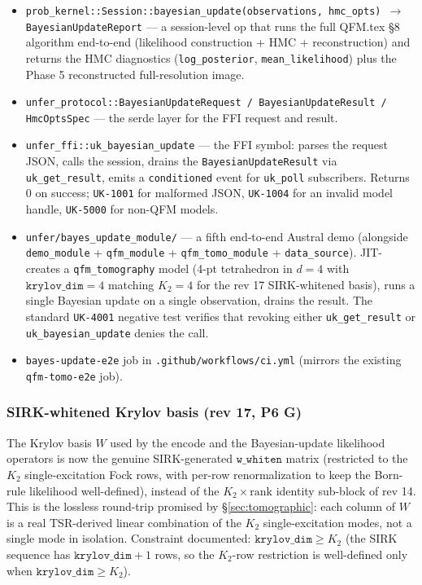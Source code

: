 \documentclass[11pt, a4paper]{article}
\begin{document}
\begin{itemize}
\item \texttt{prob\_kernel::Session::bayesian\_update(observations, hmc\_opts)
  $\to$ BayesianUpdateReport} --- a session-level op that runs the
  full QFM.tex \S8 algorithm end-to-end (likelihood construction
  + HMC + reconstruction) and returns the HMC diagnostics
  (\texttt{log\_posterior}, \texttt{mean\_likelihood}) plus the
  Phase 5 reconstructed full-resolution image.
\item \texttt{unfer\_protocol::BayesianUpdateRequest /
  BayesianUpdateResult / HmcOptsSpec} --- the serde layer for
  the FFI request and result.
\item \texttt{unfer\_ffi::uk\_bayesian\_update} --- the FFI
  symbol: parses the request JSON, calls the session, drains the
  \texttt{BayesianUpdateResult} via \texttt{uk\_get\_result},
  emits a \texttt{conditioned} event for \texttt{uk\_poll}
  subscribers. Returns 0 on success; \texttt{UK-1001} for
  malformed JSON, \texttt{UK-1004} for an invalid model handle,
  \texttt{UK-5000} for non-QFM models.
\item \texttt{unfer/bayes\_update\_module/} --- a fifth end-to-end
  Austral demo (alongside \texttt{demo\_module} +
  \texttt{qfm\_module} + \texttt{qfm\_tomo\_module} +
  \texttt{data\_source}). JIT-creates a \texttt{qfm\_tomography}
  model (4-pt tetrahedron in $d=4$ with $\texttt{krylov\_dim}=4$
  matching $K_2=4$ for the rev 17 SIRK-whitened basis), runs a
  single Bayesian update on a single observation, drains the
  result. The standard \texttt{UK-4001} negative test verifies
  that revoking either \texttt{uk\_get\_result} or
  \texttt{uk\_bayesian\_update} denies the call.
\item \texttt{bayes-update-e2e} job in
  \texttt{.github/workflows/ci.yml} (mirrors the existing
  \texttt{qfm-tomo-e2e} job).
\end{itemize}

\subsubsection*{SIRK-whitened Krylov basis (rev 17, P6 G)}

The Krylov basis $W$ used by the encode and the Bayesian-update
likelihood operators is now the genuine SIRK-generated
$\texttt{w\_whiten}$ matrix (restricted to the $K_2$
single-excitation Fock rows, with per-row renormalization to keep
the Born-rule likelihood well-defined), instead of the
$K_2 \times \mathrm{rank}$ identity sub-block of rev 14. This is
the lossless round-trip promised by \S\ref{sec:tomographic}: each
column of $W$ is a real TSR-derived linear combination of the
$K_2$ single-excitation modes, not a single mode in isolation.
Constraint documented: $\texttt{krylov\_dim} \ge K_2$ (the SIRK
sequence has $\texttt{krylov\_dim}+1$ rows, so the $K_2$-row
restriction is well-defined only when
$\texttt{krylov\_dim} \ge K_2$).
\end{document}
